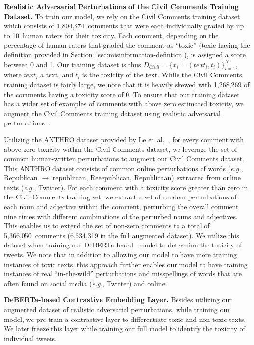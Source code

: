 \vspace{2pt}\noindent
\noindent
\textbf{Realistic Adversarial Perturbations of the Civil Comments Training Dataset.} To train our model, we rely on the Civil Comments training dataset which consists of 1,804,874~comments that were each individually graded by up to 10~human raters for their toxicity. Each comment, depending on the percentage of human raters that graded the comment as ``toxic'' (toxic having the definition provided in Section~\ref{sec:misinformation-defintion}), is assigned a score between 0 and 1. Our  training dataset is thus $D_{Civil} = \{x_i = (text_i,t_i)\}^N_{i=1}$, where $text_i$ a text, and $t_i$ is the toxicity of the text. While the Civil Comments training dataset is fairly large, we note that it is heavily skewed with 1,268,269 of the comments having a toxicity score of 0. To ensure that our training dataset has a wider set of examples of comments with above zero estimated toxicity, we augment the Civil Comments training dataset using realistic adversarial perturbations~\cite{le2022perturbations}. 


Utilizing the ANTHRO dataset provided by Le  {et~al.}~\cite{le2022perturbations}, for every comment with above zero toxicity within the Civil Comments dataset, we leverage the set of common human-written perturbations to augment our Civil Comments dataset. This ANTHRO dataset consists of common online perturbations of words (\textit{e.g.}, Republican $\rightarrow$ republiican, Reeepublican, Republicaan) extracted from online texts (\textit{e.g.}, Twitter). For each comment with a toxicity score greater than zero in the Civil Comments training set, we extract a set of random perturbations of each noun and adjective within the comment, perturbing the overall comment nine times with different combinations of the perturbed nouns and adjectives. This enables us to extend the set of non-zero comments to a total of 5,366,050~comments (6,634,319 in the full augmented dataset). We utilize this dataset when training our DeBERTa-based~\cite{he2022debertav3} model to determine the toxicity of tweets. We note that in addition to allowing our model to have more training instances of toxic texts, this approach further enables our model to have training instances of real ``in-the-wild'' perturbations and misspellings of words that are often found on social media (\textit{e.g.}, Twitter) and online.




\vspace{2pt}\noindent
\noindent
\textbf{DeBERTa-based Contrastive Embedding Layer.} Besides utilizing our augmented dataset of realistic adversarial perturbations, while training our model, we pre-train a contrastive layer to differentiate toxic and non-toxic texts. We later freeze this layer while training our full model to identify the toxicity of individual tweets.


